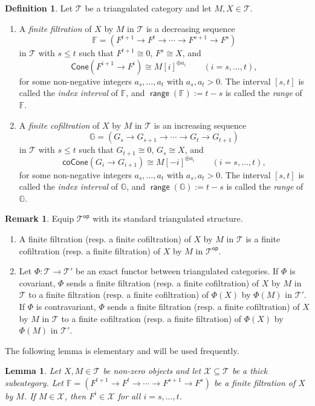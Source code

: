 \documentclass[10pt, a4paper,reqno]{amsart}
\newtheorem{lem}[lem]{Lemma}
\theoremstyle{definition}
\newtheorem{dfn}[dfn]{Definition}
\newtheorem{rmk}[rmk]{Remark}
\theoremstyle{remark}
\numberwithin{equation}{thm}
\def\FF{\mathbb{F}}
\def\GG{\mathbb{G}}
\def\cT{\mathcal{T}}
\def\cX{\mathcal{X}}
\def\range{\operatorname{\mathsf{range}}}
\def\Cone{\mathsf{Cone}}
\def\coCone{\mathsf{coCone}}
\def\op{\mathsf{op}}
\begin{document}
\begin{dfn}
Let $\cT$ be a triangulated 	category and let $M, X \in \cT$.
\begin{enumerate}[\rm(1)]
\item
A {\em finite filtration} of $X$ by $M$ in $\cT$ is a decreasing sequence
\[
\FF = (F^{t+1} \to F^{t} \to \cdots \to F^{s+1} \to F^s)
\]
in $\cT$ with $s \le t$ such that $F^{t+1} \cong 0$, $F^s \cong X$, and 
\[
\Cone(F^{i+1} \to F^i ) \cong M[i]^{\oplus a_i}\qquad(i=s,\ldots,t),
\]
for some non-negative integers $a_s,\ldots,a_t$ with $a_s,a_t > 0$.
The interval $[s,t]$ is called the {\em index interval} of $\FF$, and $\range(\FF) := t-s$ is called the {\em range} of $\FF$.

\item
A {\em finite cofiltration} of $X$ by $M$ in $\cT$ is an increasing sequence
\[
\GG = (G_{s} \to G_{s+1} \to \cdots \to G_{t} \to G_{t+1})
\]
in $\cT$ with $s \le t$ such that $G_{t+1} \cong 0$, $G_s \cong X$, and 
\[
\coCone(G_{i} \to G_{i+1}) \cong M[-i]^{\oplus a_i}\qquad(i=s,\ldots,t),
\]
for some non-negative integers $a_s,\ldots,a_t$ with $a_s,a_t > 0$.
The interval $[s,t]$ is called the {\em index interval} of $\GG$, and $\range(\GG) := t-s$ is called the {\em range} of $\GG$.
\end{enumerate}
\end{dfn}

\begin{rmk}
Equip $\cT^\op$ with its standard triangulated structure.
\begin{enumerate}[\rm(1)]
\item
A finite filtration (resp. a finite cofiltration) of $X$ by $M$ in $\cT$ is a finite cofiltration (resp. a finite filtration) of $X$ by $M$ in $\cT^\op$.
\item
Let $\Phi: \cT \to \cT'$ be an exact functor between triangulated categories.
If $\Phi$ is covariant, $\Phi$ sends a finite filtration (resp. a finite cofiltration) of $X$ by $M$ in $\cT$ to a finite filtration (resp. a finite cofiltration) of $\Phi(X)$ by $\Phi(M)$ in $\cT'$.
If $\Phi$ is contravariant, $\Phi$ sends a finite filtration (resp. a finite cofiltration) of $X$ by $M$ in $\cT$ to a finite cofiltration (resp. a finite filtration) of $\Phi(X)$ by $\Phi(M)$ in $\cT'$.
\end{enumerate}
\end{rmk}


The following lemma is elementary and will be used frequently.

\begin{lem}\label{thick}
Let $X,M \in \cT$ be non-zero objects and let $\cX \subseteq \cT$ be a thick subcategory.
Let $\FF = (F^{t+1} \to F^{t} \to \cdots \to F^{s+1} \to F^s)$ be a finite filtration of $X$ by $M$.
If $M \in \cX$, then $F^i \in \cX$ for all $i=s,\ldots,t$. 	
\end{lem}
\end{document}
